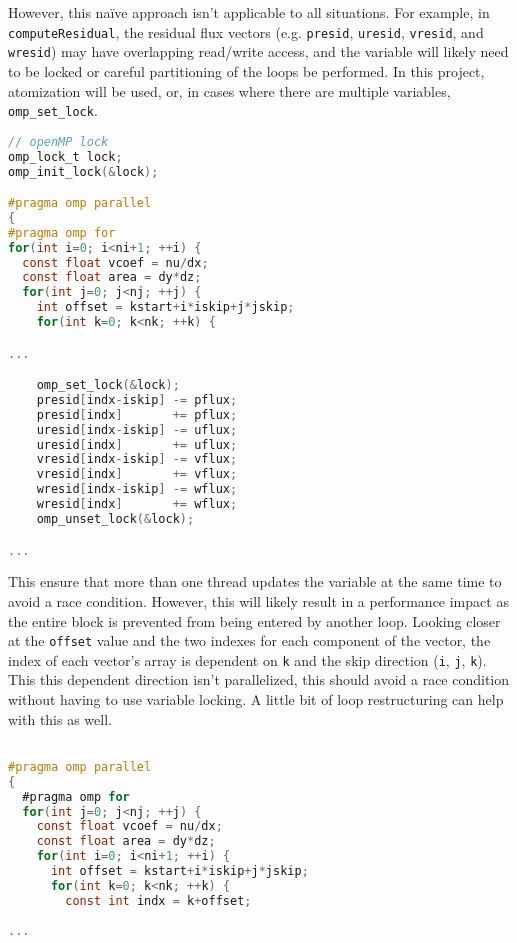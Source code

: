 \documentclass{article}
\begin{document}
  However, this na\"{i}ve approach isn't applicable to all situations. For
  example, in \verb|computeResidual|, the residual flux vectors (e.g. 
  \verb|presid|, \verb|uresid|, \verb|vresid|, and \verb|wresid|) may have
  overlapping read/write access, and the variable will likely need to be
  locked or careful partitioning of the loops be performed. In this project,
  atomization will be used, or, in cases where there are multiple variables,
  \verb|omp_set_lock|.

  \begin{lstlisting}[language=C, linewidth=1\textwidth, breaklines=true]
// openMP lock
omp_lock_t lock;
omp_init_lock(&lock);

#pragma omp parallel
{
#pragma omp for
for(int i=0; i<ni+1; ++i) {
  const float vcoef = nu/dx;
  const float area = dy*dz;
  for(int j=0; j<nj; ++j) {
    int offset = kstart+i*iskip+j*jskip;
    for(int k=0; k<nk; ++k) {

...

    omp_set_lock(&lock);
    presid[indx-iskip] -= pflux;
    presid[indx]       += pflux;
    uresid[indx-iskip] -= uflux;
    uresid[indx]       += uflux;
    vresid[indx-iskip] -= vflux;
    vresid[indx]       += vflux;
    wresid[indx-iskip] -= wflux;
    wresid[indx]       += wflux;
    omp_unset_lock(&lock);

...

  \end{lstlisting}

  This ensure that more than one thread updates the variable at the same time
  to avoid a race condition. However, this will likely result in a performance
  impact as the entire block is prevented from being entered by another loop.
  Looking closer at the \verb|offset| value and the two indexes for each
  component of the vector, the index of each vector's array is dependent on
  \verb|k| and the skip direction (\verb|i|, \verb|j|, \verb|k|). This this
  dependent direction isn't parallelized, this should avoid a race condition
  without having to use variable locking. A little bit of loop restructuring
  can help with this as well.


  \begin{lstlisting}[language=C, linewidth=1\textwidth, breaklines=true]

#pragma omp parallel
{
  #pragma omp for
  for(int j=0; j<nj; ++j) {
    const float vcoef = nu/dx;
    const float area = dy*dz;
    for(int i=0; i<ni+1; ++i) {
      int offset = kstart+i*iskip+j*jskip;
      for(int k=0; k<nk; ++k) {
        const int indx = k+offset;
    
...

  \end{lstlisting}
\end{document}
